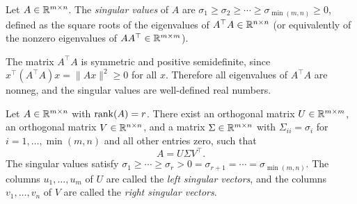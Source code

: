 \documentclass[11pt,a4paper]{article}
\begin{document}
\begin{definition}
\label{def:singular_values}
Let $A \in \mathbb{R}^{m \times n}$.  The \emph{singular values} of $A$ are
$\sigma_1 \geq \sigma_2 \geq \cdots \geq \sigma_{\min(m,n)} \geq 0$,
defined as the square roots of the eigenvalues of $A^\top A \in \mathbb{R}^{n \times n}$
(or equivalently of the nonzero eigenvalues of $AA^\top \in \mathbb{R}^{m \times m}$).
\end{definition}

\begin{remark}
\label{rem:ata_psd}
The matrix $A^\top A$ is symmetric and positive semidefinite, since
$x^\top(A^\top A)x = \|Ax\|^2 \geq 0$ for all $x$.  Therefore all
eigenvalues of $A^\top A$ are nonneg, and the singular values are
well-defined real numbers.
\end{remark}

\begin{keyresult}[title={The Singular Value Decomposition}]
\begin{theorem}
\label{thm:svd}
Let $A \in \mathbb{R}^{m \times n}$ with $\operatorname{rank}(A) = r$.  There exist an
orthogonal matrix $U \in \mathbb{R}^{m \times m}$, an orthogonal matrix
$V \in \mathbb{R}^{n \times n}$, and a matrix $\Sigma \in \mathbb{R}^{m \times n}$
with $\Sigma_{ii} = \sigma_i$ for $i = 1, \ldots, \min(m,n)$ and all
other entries zero, such that
\[
  A = U \Sigma V^\top.
\]
The singular values satisfy
$\sigma_1 \geq \cdots \geq \sigma_r > 0 = \sigma_{r+1} = \cdots = \sigma_{\min(m,n)}$.
The columns $u_1, \ldots, u_m$ of $U$ are called the
\emph{left singular vectors}, and the columns $v_1, \ldots, v_n$
of $V$ are called the \emph{right singular vectors}.
\end{theorem}
\end{keyresult}
\end{document}

